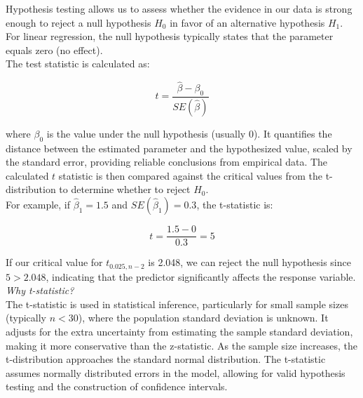Hypothesis testing allows us to assess whether the evidence in our data is strong enough to reject a null hypothesis \(H_0\) in favor of an alternative hypothesis \(H_1\). For linear regression, the null hypothesis typically states that the parameter equals zero (no effect).\\

The test statistic is calculated as:

\[
t = \frac{\hat{\beta} - \beta_0}{SE(\hat{\beta})}
\]

where \(\beta_0\) is the value under the null hypothesis (usually 0). It quantifies the distance between the estimated parameter and the hypothesized value, scaled by the standard error, providing reliable conclusions from empirical data. The calculated \(t\) statistic is then compared against the critical values from the t-distribution to determine whether to reject \(H_0\).\\

For example, if \(\hat{\beta}_1 = 1.5\) and \(SE(\hat{\beta}_1) = 0.3\), the t-statistic is:

\[
t = \frac{1.5 - 0}{0.3} = 5
\]

If our critical value for \(t_{0.025, n-2}\) is 2.048, we can reject the null hypothesis since \(5 > 2.048\), indicating that the predictor significantly affects the response variable.\\

\textit{Why t-statistic?}\\

The t-statistic is used in statistical inference, particularly for small sample sizes (typically \(n < 30\)), where the population standard deviation is unknown. It adjusts for the extra uncertainty from estimating the sample standard deviation, making it more conservative than the z-statistic. As the sample size increases, the t-distribution approaches the standard normal distribution. The t-statistic assumes normally distributed errors in the model, allowing for valid hypothesis testing and the construction of confidence intervals.

